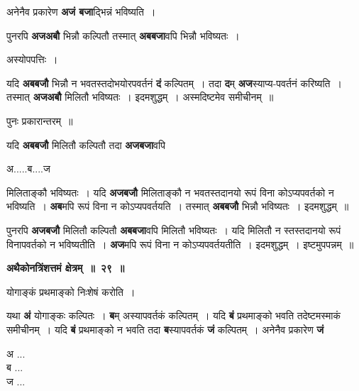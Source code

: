 \documentclass[11pt, openany]{book}
\begin{document}
 अनेनैव प्रकारेण \textbf{अजं बजा}द्भिन्नं भविष्यति~।\\ 
\vspace{-1mm}

 पुनरपि \textbf{अजअबौ} भिन्नौ कल्पितौ तस्मात् \textbf{अबबजा}वपि भिन्नौ भविष्यतः~। 

\begin{center}
अस्योपपत्तिः~।
\end{center}

यदि \textbf{अबबजौ} भिन्नौ न भवतस्तदोभयोरपवर्तनं \textbf{दं} कल्पितम्~। तदा \textbf{द}म् \textbf{अज}स्याप्य-पवर्तनं करिष्यति~। तस्मात् \textbf{अजअबौ} मिलितौ भविष्यतः~। इदमशुद्धम्~। अस्मदिष्टमेव समीचीनम्~॥ 

\begin{center}
पुनः प्रकारान्तरम्~॥ 
\end{center}

\begin{flushleft}
\begin{minipage}[t]{0.65\textwidth}
\hspace{4mm} यदि \textbf{अबबजौ} मिलितौ कल्पितौ तदा \textbf{अजबजा}वपि
\end{minipage} 
\hfill
\begin{minipage}[t]{0.25\textwidth}
अ.....ब....ज
\end{minipage}
\end{flushleft}
\vspace{-3mm}
 
\noindent मिलिताङ्कौ भविष्यतः~। यदि \textbf{अजबजौ} मिलिताङ्कौ न भवतस्तदानयो रूपं विना कोऽप्यपवर्तको न भविष्यति~। \textbf{अब}मपि रूपं विना न कोऽप्यपवर्तयति~। तस्मात् \textbf{अबबजौ} भिन्नौ भविष्यतः~। इदमशुद्धम्~॥ 

\newpage
पुनरपि \textbf{अजबजौ} मिलितौ कल्पितौ \textbf{अबबजा}वपि मिलितौ भविष्यतः~। यदि मिलितौ न स्तस्तदानयो रूपं विनापवर्तको न भविष्यतीति~। \textbf{अज}मपि रूपं विना न कोऽप्यपवर्तयतीति~। इदमशुद्धम्~। इष्टमुपपन्नम्~॥ 
\vspace{2mm}

\begin{center}
\textbf{\large अथैकोनत्रिंशत्तमं क्षेत्रम्~॥~२९~॥}
\end{center}

{\ab योगाङ्कं प्रथमाङ्को निःशेषं करोति~। }

\begin{flushleft}
\begin{minipage}[t]{0.75\textwidth}
\hspace{4mm} यथा \textbf{अं} योगाङ्कः कल्पितः~। \textbf{ब}म् अस्यापवर्तकं कल्पितम्~। यदि \textbf{बं} प्रथमाङ्को भवति तदेष्टमस्माकं समीचीनम्~। यदि \textbf{बं} प्रथमाङ्को न भवति तदा \textbf{ब}स्यापवर्तकं \textbf{जं} कल्पितम्~। अनेनैव प्रकारेण \textbf{जं}
\end{minipage} 
\hfill
\begin{minipage}[t]{0.15\textwidth}
अ ...\\
ब ...\\
ज ...
\end{minipage}
\end{flushleft}
\vspace{-3mm}
\end{document}
